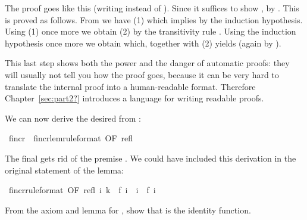 \begin{isabellebody}
\begin{isamarkuptext}
\begin{isabelle}
\isanewline
{}
\end{isabelle}
%
The proof goes like this (writing  instead of ).
Since  it suffices to show
\hbox{},
by \@.  This is
proved as follows. From  we have 
(1) which implies  by the induction hypothesis.
Using (1) once more we obtain  (2) by the transitivity
rule .
Using the induction hypothesis once more we obtain 
which, together with (2) yields  (again by
).

This last step shows both the power and the danger of automatic proofs: they
will usually not tell you how the proof goes, because it can be very hard to
translate the internal proof into a human-readable format. Therefore
Chapter~\ref{sec:part2?} introduces a language for writing readable
proofs.

We can now derive the desired  from :%
\end{isamarkuptext}%
\ f{\isacharunderscore}incr\ {\isacharequal}\ f{\isacharunderscore}incr{\isacharunderscore}lem{\isacharbrackleft}rule{\isacharunderscore}format{\isacharcomma}\ OF\ refl{\isacharbrackright}%
\begin{isamarkuptext}%
\noindent
The final  gets rid of the premise . 
We could have included this derivation in the original statement of the lemma:%
\end{isamarkuptext}%
\ f{\isacharunderscore}incr{\isacharbrackleft}rule{\isacharunderscore}format{\isacharcomma}\ OF\ refl{\isacharbrackright}{\isacharcolon}\ {\isachardoublequote}{\isasymforall}i{\isachardot}\ k\ {\isacharequal}\ f\ i\ {\isasymlongrightarrow}\ i\ {\isasymle}\ f\ i{\isachardoublequote}%
\begin{isamarkuptext}%
\begin{exercise}
From the axiom and lemma for , show that  is the
identity function.
\end{exercise}


\end{isamarkuptext}
\end{isabellebody}
